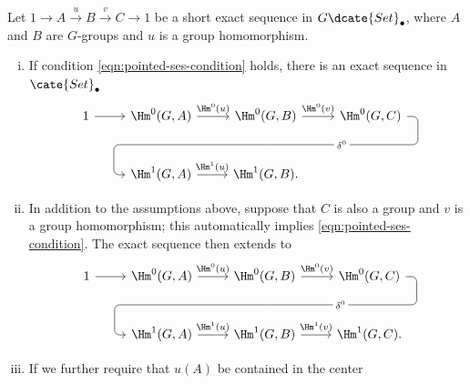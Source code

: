 \begin{theorem}\label{prop:nonabelian-long}
	Let $1\to A\xrightarrow{u}B\xrightarrow{v}C\to1$ be a short exact
	sequence in $G\dcate{Set}_\bullet$, where $A$ and $B$ are $G$-groups and
	$u$ is a group homomorphism.
	\begin{enumerate}[(i)]
		\item If condition \eqref{eqn:pointed-ses-condition} holds, there is
		an exact sequence in $\cate{Set}_\bullet$
		\begin{equation*}\begin{tikzcd}[row sep=large]
			1 \arrow[r] & \Hm^0(G, A) \arrow[r, "{\Hm^0(u)}"] & \Hm^0(G, B) \arrow[r, "{\Hm^0(v)}"] \arrow[phantom, d, ""{coordinate, name=A}] & \Hm^0(G, C) \arrow[dll, rounded corners, "{\delta^0}" description, to path={
				-- ([xshift=2ex]\tikztostart.east)
				|- (A) [near end]\tikztonodes
				-| ([xshift=-2ex]\tikztotarget.west)
				-- (\tikztotarget)}] \\
			& \Hm^1(G, A) \arrow[r, "{\Hm^1(u)}"] & \Hm^1(G, B). &
		\end{tikzcd}\end{equation*}
		\item In addition to the assumptions above, suppose that $C$ is also
		a group and $v$ is a group homomorphism; this automatically implies
		\eqref{eqn:pointed-ses-condition}. The exact sequence then extends to
		\begin{equation*}\begin{tikzcd}[row sep=large]
			1 \arrow[r] & \Hm^0(G, A) \arrow[r, "{\Hm^0(u)}"] & \Hm^0(G, B) \arrow[r, "{\Hm^0(v)}"] \arrow[phantom, d, ""{coordinate, name=A}] & \Hm^0(G, C) \arrow[dll, rounded corners, "{\delta^0}" description, to path={
				-- ([xshift=2ex]\tikztostart.east)
				|- (A) [near end]\tikztonodes
				-| ([xshift=-2ex]\tikztotarget.west)
				-- (\tikztotarget)}] \\
			& \Hm^1(G, A) \arrow[r, "{\Hm^1(u)}"] & \Hm^1(G, B) \arrow[r, "{\Hm^1(v)}"] & \Hm^1(G, C).
		\end{tikzcd}\end{equation*}
		\item If we further require that $u(A)$ be contained in the center

\end{enumerate}
\end{theorem}
